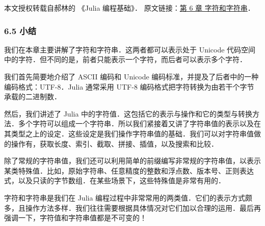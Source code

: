 
本文授权转载自郝林的 《Julia 编程基础》． 原文链接：\href{https://github.com/hyper0x/JuliaBasics/blob/master/book/ch06.md}{第 6 章 字符和字符串}．


\subsubsection{6.5 小结}

我们在本章主要讲解了字符和字符串．这两者都可以表示处于 Unicode 代码空间中的字符．但不同的是，前者只能表示一个字符，而后者可以表示多个字符．

我们首先简要地介绍了 ASCII 编码和 Unicode 编码标准，并提及了后者中的一种编码格式：UTF-8．Julia 通常采用 UTF-8 编码格式把字符转换为由若干个字节承载的二进制数．

然后，我们讲述了 Julia 中的字符值．这包括它的表示与操作和它的类型与转换方法．多个字符可以组成一个字符串．所以我们紧接着又讲了字符串值的表示以及在其类型之上的设定．这些设定是我们操作字符串值的基础．我们可以对字符串值做的操作有，获取长度、索引、截取、拼接、插值，以及搜索和比较．

除了常规的字符串值，我们还可以利用简单的前缀编写非常规的字符串值，以表示某类特殊值．比如，原始字符串、任意精度的整数和浮点数、版本号、正则表达式，以及只读的字节数组．在某些场景下，这些特殊值是非常有用的．

字符和字符串是我们在 Julia 编程过程中非常常用的两类值．它们的表示方式颇多，且操作方法多样．我们往往需要根据具体情况对它们加以合理的运用．最后再强调一下，字符值和字符串值都是不可变的！

